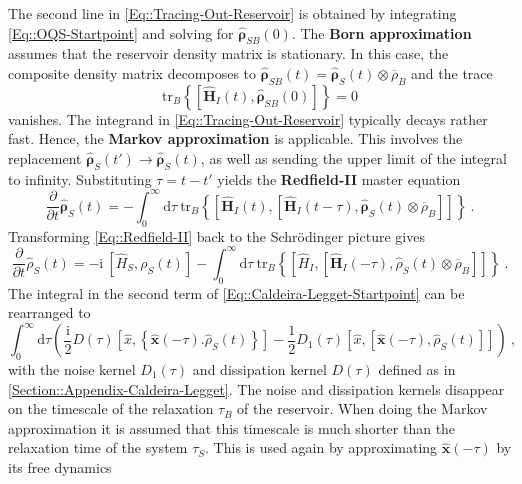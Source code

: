 	The second line in \autoref{Eq::Tracing-Out-Reservoir} is obtained by integrating \autoref{Eq::OQS-Startpoint} and solving for $\boldsymbol{\hat{\rho}}_{SB}(0)$. The \textbf{Born approximation}  assumes that the reservoir density matrix is stationary. In this case, the composite density matrix decomposes to $\boldsymbol{\hat{\rho}}_{SB}(t) = \boldsymbol{\hat{\rho}}_S(t) \otimes \overline{\rho}_B$ and the trace 
	\begin{equation}
		\text{tr}_B \left\lbrace \left[\boldsymbol{\hat{H}}_I(t), \boldsymbol{\hat{\rho}}_{SB}(0)\right] \right \rbrace =	0
	\end{equation}
	vanishes. The integrand in  \autoref{Eq::Tracing-Out-Reservoir} typically decays rather fast. Hence, the \textbf{Markov approximation} \cite{landi2022nonequilibrium} is applicable. This involves the replacement $\boldsymbol{\hat{\rho}}_S(t') \rightarrow \boldsymbol{\hat{\rho}}_S(t)$, as well as  sending the upper limit of the integral to infinity. Substituting $\tau =t - t'$ yields the \textbf{Redfield-II} master equation
	\begin{equation} \label{Eq::Redfield-II}
		\frac{\partial}{\partial t} \boldsymbol{\hat{\rho}}_S(t) = - \int_{0}^{\infty} \text{d}\tau~ \text{tr}_B \left\{  \left[\boldsymbol{\hat{H}}_I(t), \left[\boldsymbol{\hat{H}}_I(t - \tau), \boldsymbol{\hat{\rho}}_S(t) \otimes \overline{\rho}_B \right]\right]  \right\} ~.
	\end{equation}
	Transforming \autoref{Eq::Redfield-II} back to the Schrödinger picture gives
	\begin{equation} \label{Eq::Caldeira-Legget-Startpoint}
		\frac{\partial}{\partial t} {\hat{\rho}}_S(t) =	-\mathrm{i}~\left[\hat{H}_S, \rho_S(t)\right] - \int_{0}^{\infty} \text{d}\tau~ \text{tr}_B \left\{  \left[{\hat{H}}_I, \left[{\boldsymbol{\hat{H}}}_I(- \tau), {\hat{\rho}}_S(t) \otimes \overline{\rho}_B \right]\right]  \right\}~.
	\end{equation}
	The integral in the second term of \autoref{Eq::Caldeira-Legget-Startpoint} can be rearranged to
	\begin{equation} \label{Eq::CD-Trace-with-Kernels}
		\int_{0}^{\infty} \text{d}\tau \left(\frac{\mathrm{i}}{2} D(\tau) \left[\hat{x}, \left\{\boldsymbol{\hat{x}}(-\tau). \hat{\rho}_S(t)\right\}\right] - \frac{1}{2} D_1(\tau) \left[\hat{x}, \left[\boldsymbol{\hat{x}}(-\tau) , \hat{\rho}_S(t)\right]\right]\right)~,
	\end{equation}
	with the noise kernel $D_1(\tau)$ and dissipation kernel $D(\tau)$ defined as in \autoref{Section::Appendix-Caldeira-Legget}. The noise and dissipation kernels disappear on the timescale of the relaxation $\tau_B$ of the reservoir. When doing the Markov approximation it is assumed that this timescale is much shorter than the relaxation time of the system $\tau_S$. This is used again by approximating $\boldsymbol{\hat{x}}(-\tau)$ by its free dynamics
